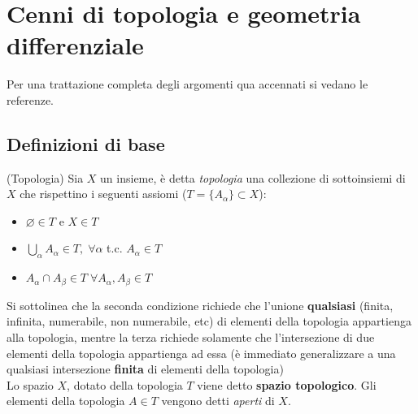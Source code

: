 
\chapter{Cenni di topologia e geometria differenziale}
Per una trattazione completa degli argomenti qua accennati si vedano le referenze.

\section{Definizioni di base}

\begin{definition}{(Topologia)}
  Sia $X$ un insieme, è detta \emph{topologia} una collezione di sottoinsiemi
  di $X$ che rispettino i seguenti assiomi ($T = \{A_\alpha\} \subset X$):
     \begin{itemize}
          \item $\varnothing \in T$ e $X \in T$
          \item $ \bigcup\limits_\alpha A_\alpha \in T, \;
             \forall \alpha $ t.c. $A_\alpha \in T$
          \item $ A_\alpha \cap A_\beta \in T \;
             \forall A_\alpha, A_\beta \in T$
     \end{itemize}
\end{definition}
Si sottolinea che la seconda condizione richiede che l'unione \textbf {qualsiasi}
(finita, infinita, numerabile, non numerabile, etc) di elementi della topologia
appartienga alla topologia, mentre la terza richiede solamente che l'intersezione
di due elementi della topologia appartienga ad essa (è immediato generalizzare
a una qualsiasi intersezione \textbf{finita} di elementi della topologia)\\

Lo spazio $X$, dotato della topologia $T$ viene detto \textbf{spazio topologico}.
Gli elementi della topologia $A \in T$ vengono detti \textit{aperti} di $X$.\\

